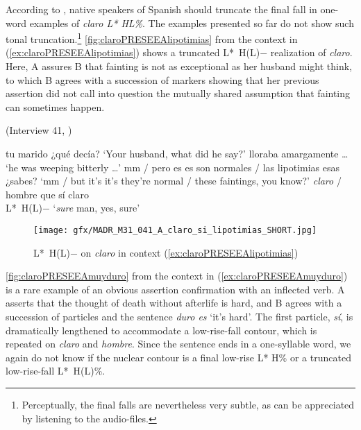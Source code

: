 According to \citet{TorreiraGrice.2018}, native speakers of Spanish should truncate the final fall in one-word examples of \textit{claro L* HL\%}. The examples presented so far do not show such tonal truncation.\footnote{Perceptually, the final falls are nevertheless very subtle, as can be appreciated by listening to the audio-files.} \autoref{fig:claroPRESEEAlipotimias} from the context in (\ref{ex:claroPRESEEAlipotimias}) shows a truncated L*~H(L)$-$ realization of \textit{claro}. Here, A assures B that fainting is not as exceptional as her husband might think, to which B agrees with a succession of markers showing that her previous assertion did not call into question the mutually shared assumption that fainting can sometimes happen.\largerpage

\begin{exe} 	
	\ex \label{ex:claroPRESEEAlipotimias} (Interview 41, \cite{PRESEEA.20142020})
	\begin{xlist}[A:]
	 tu marido ¿qué decía?
	\glt `Your husband, what did he say?'
	 lloraba amargamente \ldots
	\glt `he was weeping bitterly \ldots'
	 mm / pero es es son normales / las lipotimias esas ¿sabes? 
	\glt `mm / but it's it's they're normal / these faintings, you know?'
	 \textit{claro} / hombre que sí claro \\
	\hspace*{.5em}L*~H(L)$-$
	\glt `\textit{sure} man, yes, sure'
	\end{xlist}
\end{exe}

\begin{figure}
	\centering
	\texttt{[image: gfx/MADR\_M31\_041\_A\_claro\_si\_lipotimias\_SHORT.jpg]}
	\caption{L*~H(L)$-$ on \textit{claro} in context (\ref{ex:claroPRESEEAlipotimias}) \href{https://osf.io/5qgxy/}{\faVolumeUp} \label{fig:claroPRESEEAlipotimias}}
\end{figure}

\autoref{fig:claroPRESEEAmuyduro} from the context in (\ref{ex:claroPRESEEAmuyduro}) is a rare example of an obvious assertion confirmation with an inflected verb. A asserts that the thought of death without afterlife is hard, and B agrees with a succession of particles and the sentence \textit{duro es} `it's hard'. The first particle, \textit{sí}, is dramatically lengthened to accommodate a low-rise-fall contour, which is repeated on \textit{claro} and \textit{hombre}. Since the sentence ends in a one-syllable word, we again do not know if the nuclear contour is a final low-rise L* H\% or a truncated low-rise-fall L*~H(L)\%.

